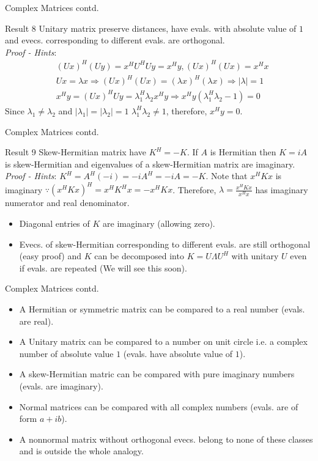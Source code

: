 \documentclass{beamer}
\begin{document}
\begin{frame}{Complex Matrices contd.}
\begin{block}{Result 8}
Unitary matrix preserve distances, have evals. with absolute value of $1$ and evecs. corresponding to different evals. are orthogonal.\\
\textit{Proof - Hints}:\\
\begin{align*}
    &(Ux)^H(Uy) = x^HU^HUy = x^Hy, (Ux)^H(Ux) = x^Hx\\
    &Ux = \lambda x\Rightarrow (Ux)^H(Ux) = (\lambda x)^{H}(\lambda x) \Rightarrow |\lambda| = 1\\
    &x^Hy = (Ux)^HUy = \lambda_1^{H}\lambda_2 x^{H}y \Rightarrow x^{H}y(\lambda_1^{H}\lambda_2-1) = 0
\end{align*}
Since $\lambda_1 \neq \lambda_2$ and $|\lambda_1| = |\lambda_2| = 1$ $\lambda_1^H\lambda_2 \neq 1$, therefore, $x^Hy = 0$.
\end{block}
\end{frame}

\begin{frame}{Complex Matrices contd.}
\begin{block}{Result 9}
Skew-Hermitian matrix have $K^H = -K$. If $A$ is Hermitian then $K=iA$ is skew-Hermitian and eigenvalues of a skew-Hermitian matrix are imaginary.\\
\textit{Proof - Hints}: $K^H = A^H (-i) = -iA^H = -iA = -K$. Note that $x^HKx$ is imaginary $\because (x^HKx)^H = x^HK^Hx = -x^HKx$. Therefore, $\lambda = \frac{x^HKx}{x^Hx}$ has imaginary numerator and real denominator.
\end{block}
\begin{itemize}
    \item Diagonal entries of $K$ are imaginary (allowing zero).
    \item Evecs. of skew-Hermitian corresponding to different evals. are still orthogonal (easy proof) and $K$ can be decomposed into $K=U\Lambda U^{H}$ with unitary $U$ even if evals. are repeated (We will see this soon).
\end{itemize}
\end{frame}

\begin{frame}{Complex Matrices contd.}
\begin{itemize}
    \item A Hermitian or symmetric matrix can be compared to a real number (evals. are real).
    \item A Unitary matrix can be compared to a number on unit circle i.e. a complex number of absolute value $1$ (evals. have absolute value of $1$).
    \item A skew-Hermitian matric can be compared with pure imaginary numbers (evals. are imaginary).
    \item Normal matrices can be compared with all complex numbers (evals. are of form $a+ib$).
    \item A nonnormal matrix without orthogonal evecs. belong to none of these classes and is outside the whole analogy.
\end{itemize}
\end{frame}
\end{document}
